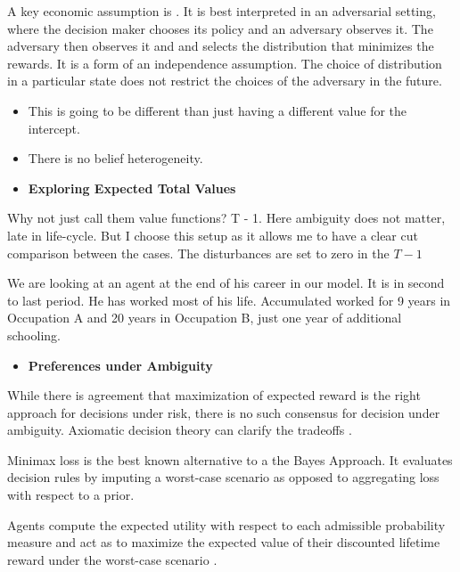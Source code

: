 A key economic assumption is . It is best interpreted in an adversarial setting, where the decision maker chooses its policy and an adversary observes it. The adversary then observes it and and selects the distribution that minimizes the rewards. It is a form of an independence assumption. The choice of distribution in a particular state does not restrict the choices of the adversary in the future. 
%
\begin{itemize}
\item This is going to be different than just having a different value for the intercept.
\item There is no belief heterogeneity.
\end{itemize}
\begin{itemize}\item[] \textbf{Exploring Expected Total Values}\end{itemize}
Why not just call them value functions? T - 1. Here ambiguity does not matter, late in life-cycle. But I choose this setup as it allows me to have a clear cut comparison between the cases. The disturbances are set to zero in the $T - 1$

We are looking at an agent at the end of his career in our model. It is in second to last period. He has worked most of his life. Accumulated worked for 9 years in Occupation A and 20 years in Occupation B, just one year of additional schooling.
\begin{itemize}\item[] \textbf{Preferences under Ambiguity}\end{itemize}
While there is agreement that maximization of expected reward is the right approach for decisions under risk, there is no such consensus for decision under ambiguity. Axiomatic decision theory can clarify the tradeoffs \citet{Stoye.2012}.

Minimax loss is the best known alternative to a the Bayes Approach. It evaluates decision rules by imputing a worst-case scenario as opposed to aggregating loss with respect to a prior.

Agents compute the expected utility with respect to each admissible probability measure and act as to maximize the expected value of their discounted lifetime reward under the worst-case scenario \citep{Maccheroni.2006,Gilboa.1989,Hansen.2007}.

